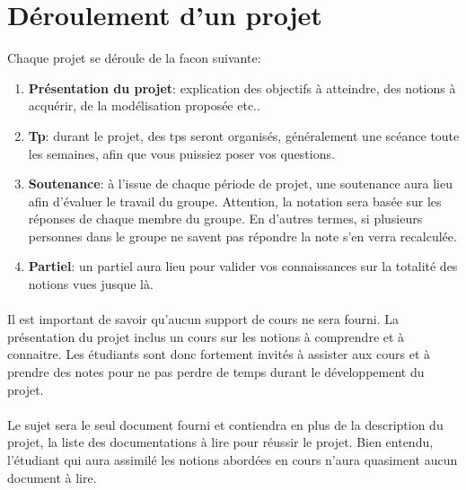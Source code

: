 \documentclass[10pt,a4wide]{article}
\begin{document}
\newpage

\section{D\'eroulement d'un projet}

Chaque projet se d\'eroule de la facon suivante:

\begin{enumerate}

\item \textbf{Pr\'esentation du projet}: explication des objectifs \`a
      atteindre, des notions \`a acqu\'erir, de la mod\'elisation propos\'ee
      etc..

\item \textbf{Tp}: durant le projet, des tps seront organis\'es,
      g\'en\'eralement une sc\'eance toute les semaines, afin que vous
      puissiez poser vos questions.

\item \textbf{Soutenance}: \`a l'issue de chaque p\'eriode de projet, une
      soutenance aura lieu afin d'\'evaluer le travail du groupe. Attention,
      la notation sera bas\'ee sur les r\'eponses de chaque membre du groupe.
      En d'autres termes, si plusieurs personnes dans le groupe ne savent
      pas r\'epondre la note s'en verra recalcul\'ee.

\item \textbf{Partiel}: un partiel aura lieu pour valider vos connaissances
      sur la totalit\'e des notions vues jusque l\`a.

\end{enumerate}

\paragraph{}

Il est important de savoir qu'aucun support de cours ne sera fourni. La
pr\'esentation du projet inclus un cours sur les notions \`a comprendre
et \`a connaitre. Les \'etudiants sont donc fortement invit\'es \`a
assister aux cours et \`a prendre des notes pour ne pas perdre de temps
durant le d\'eveloppement du projet.

\paragraph{}

Le sujet sera le seul document fourni et contiendra en plus de la description
du projet, la liste des documentations \`a lire pour r\'eussir le projet.
Bien entendu, l'\'etudiant qui aura assimil\'e les notions abord\'ees en
cours n'aura quasiment aucun document \`a lire.
\end{document}
